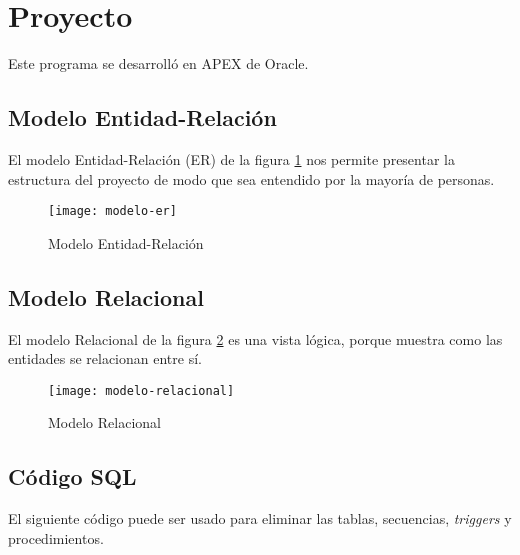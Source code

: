 \section{Proyecto}
Este programa se desarrolló en APEX de Oracle.
\subsection{Modelo Entidad-Relación}
El modelo Entidad-Relación (ER) de la figura \ref{fig:modelo-er} nos permite presentar la estructura del proyecto de modo que sea entendido por la mayoría de personas.
\begin{figure}[H]
  \centering
  \texttt{[image: modelo-er]}
  \caption{Modelo Entidad-Relación}
  \label{fig:modelo-er}
\end{figure}

\subsection{Modelo Relacional}
El modelo Relacional de la figura \ref{fig:modelo-relacional} es una vista lógica, porque muestra como las entidades se relacionan entre sí.
\begin{figure}[H]
  \centering
  \texttt{[image: modelo-relacional]}
  \caption{Modelo Relacional}
  \label{fig:modelo-relacional}
\end{figure}

\subsection{Código SQL}


El siguiente código puede ser usado para eliminar las tablas, secuencias, \textit{triggers} y procedimientos.
